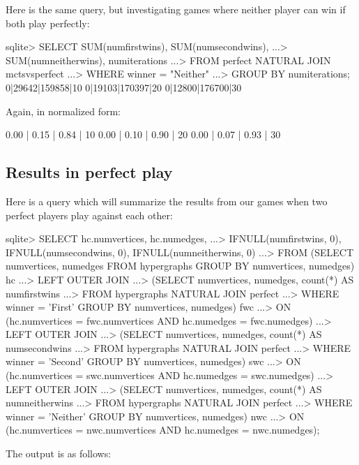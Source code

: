 Here is the same query, but investigating games where neither player can win if both play perfectly:

\begin{code}
sqlite> SELECT SUM(numfirstwins), SUM(numsecondwins),
   ...> SUM(numneitherwins), numiterations
   ...> FROM perfect NATURAL JOIN mctsvsperfect
   ...> WHERE winner = "Neither"
   ...> GROUP BY numiterations;
0|29642|159858|10
0|19103|170397|20
0|12800|176700|30
\end{code}

Again, in normalized form:

\begin{code}
0.00 | 0.15 | 0.84 | 10
0.00 | 0.10 | 0.90 | 20
0.00 | 0.07 | 0.93 | 30
\end{code}

\subsection{Results in perfect play}

Here is a query which will summarize the results from our games when two perfect players play against each other:

\begin{output}
sqlite> SELECT hc.numvertices, hc.numedges,
   ...> IFNULL(numfirstwins, 0), IFNULL(numsecondwins, 0), IFNULL(numneitherwins, 0)
   ...> FROM (SELECT numvertices, numedges FROM hypergraphs GROUP BY numvertices, numedges) hc
   ...> LEFT OUTER JOIN
   ...>   (SELECT numvertices, numedges, count(*) AS numfirstwins
   ...>    FROM hypergraphs NATURAL JOIN perfect
   ...>    WHERE winner = 'First' GROUP BY numvertices, numedges) fwc
   ...> ON (hc.numvertices = fwc.numvertices AND hc.numedges = fwc.numedges)
   ...> LEFT OUTER JOIN
   ...>   (SELECT numvertices, numedges, count(*) AS numsecondwins
   ...>    FROM hypergraphs NATURAL JOIN perfect
   ...>    WHERE winner = 'Second' GROUP BY numvertices, numedges) swc
   ...> ON (hc.numvertices = swc.numvertices AND hc.numedges = swc.numedges)
   ...> LEFT OUTER JOIN
   ...>   (SELECT numvertices, numedges, count(*) AS numneitherwins
   ...>    FROM hypergraphs NATURAL JOIN perfect
   ...>    WHERE winner = 'Neither' GROUP BY numvertices, numedges) nwc
   ...> ON (hc.numvertices = nwc.numvertices AND hc.numedges = nwc.numedges);
\end{output}
The output is as follows:

